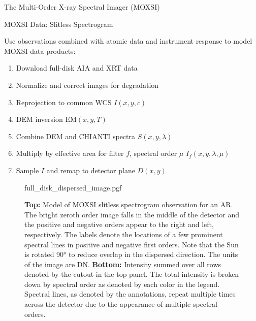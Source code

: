 \documentclass[final]{beamer}
\newlength{\colwidth}
\begin{document}
\begin{frame}[t]
\begin{columns}[t]
\begin{column}{\colwidth}
\begin{block}{The Multi-Order X-ray Spectral Imager (MOXSI)}
  \end{block}

  \begin{block}{MOXSI Data: Slitless Spectrogram}
    
    Use \alert{observations} combined with \alert{atomic data} and \alert{instrument response} to model MOXSI data products: 

    \begin{multicols}{2}
      \begin{enumerate}
        \item Download full-disk AIA and XRT data
        \item Normalize and correct images for degradation
        \item Reprojection to common WCS \rightarrow $I(x,y,c)$
        \item DEM inversion \citep{hannah_differential_2012} \rightarrow $\mathrm{EM}(x,y,T)$
        \item Combine DEM and CHIANTI spectra \rightarrow $S(x,y,\lambda)$
        \item Multiply by effective area for filter $f$, spectral order $\mu$ \rightarrow $I_f(x,y,\lambda,\mu)$
        \item Sample $I$ and remap to detector plane \rightarrow $D(x,y)$
      \end{enumerate}
    \end{multicols}

    \begin{figure}
      \centering
      {full_disk_dispersed_image.pgf}
      \caption{\textbf{Top:} Model of MOXSI slitless spectrogram observation for an AR. The bright zeroth order image falls in the middle of the detector and the positive and negative orders appear to the right and left, respectively. The labels denote the locations of a few prominent spectral lines in positive and negative first orders. Note that the Sun is rotated \ang{90} to reduce overlap in the dispersed direction. The units of the image are DN. \textbf{Bottom:} Intensity summed over all rows denoted by the cutout in the top panel. The total intensity is broken down by spectral order as denoted by each color in the legend. Spectral lines, as denoted by the annotations, repeat multiple times across the detector due to the appearance of multiple spectral orders.}
      \label{fig:full_disk_overlappograms}
    \end{figure}

  \end{block}


\end{column}
\end{columns}
\end{frame}
\end{document}
